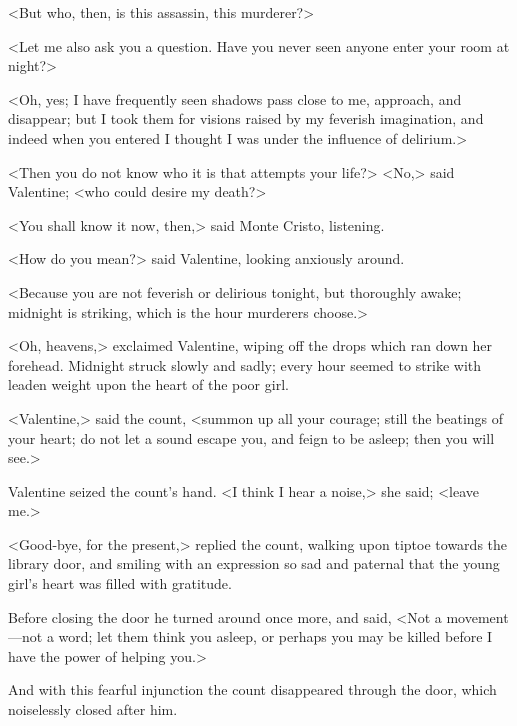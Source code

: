  <But who, then, is this assassin, this murderer?> 

 <Let me also ask you a question. Have you never seen anyone enter your room at night?> 

 <Oh, yes; I have frequently seen shadows pass close to me, approach, and disappear; but I took them for visions raised by my feverish imagination, and indeed when you entered I thought I was under the influence of delirium.> 

 <Then you do not know who it is that attempts your life?>  <No,> said Valentine; <who could desire my death?> 

 <You shall know it now, then,> said Monte Cristo, listening. 

 <How do you mean?> said Valentine, looking anxiously around. 

 <Because you are not feverish or delirious tonight, but thoroughly awake; midnight is striking, which is the hour murderers choose.> 

 <Oh, heavens,> exclaimed Valentine, wiping off the drops which ran down her forehead. Midnight struck slowly and sadly; every hour seemed to strike with leaden weight upon the heart of the poor girl. 

 <Valentine,> said the count, <summon up all your courage; still the beatings of your heart; do not let a sound escape you, and feign to be asleep; then you will see.> 

 Valentine seized the count's hand. <I think I hear a noise,> she said; <leave me.> 

 <Good-bye, for the present,> replied the count, walking upon tiptoe towards the library door, and smiling with an expression so sad and paternal that the young girl's heart was filled with gratitude. 

 Before closing the door he turned around once more, and said, <Not a movement—not a word; let them think you asleep, or perhaps you may be killed before I have the power of helping you.> 

 And with this fearful injunction the count disappeared through the door, which noiselessly closed after him. 